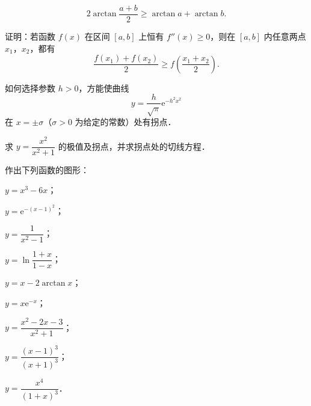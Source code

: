 \begin{xiti}
\begin{ziti}
\[
2\arctan\frac{a+b}{2} \geqslant \arctan a + \arctan b.
\]
\end{ziti}
\item 证明：若函数 $f(x)$ 在区间 $[a,b]$ 上恒有 $f''(x) \geqslant 0$，则在 $[a,b]$ 内任意两点 $x_1$，$x_2$，都有
\[
\frac{f(x_1) + f(x_2)}{2} \geqslant f\left(\frac{x_1+x_2}{2}\right).
\]
\item 如何选择参数 $h > 0$，方能使曲线
\[
y = \frac{h}{\sqrt{\pi}}\mathrm{e}^{-h^2x^2}
\]
在 $x = \pm\sigma$（$\sigma > 0$ 为给定的常数）处有拐点．
\item 求 $y = \dfrac{x^2}{x^2+1}$ 的极值及拐点，并求拐点处的切线方程．
\item 作出下列函数的图形：
\begin{ziti}
\item $y = x^3 - 6x$；
\item $y = \mathrm{e}^{-(x-1)^2}$；
\item $y = \dfrac{1}{x^2-1}$；
\item $y = \ln\dfrac{1+x}{1-x}$；
\item $y = x - 2\arctan x$；
\item $y = x\mathrm{e}^{-x}$；
\item $y = \dfrac{x^2-2x-3}{x^2+1}$；
\item $y = \dfrac{(x-1)^3}{(x+1)^3}$；
\item $y = \dfrac{x^4}{(1+x)^3}$．
\end{ziti}
\end{xiti}
